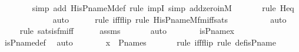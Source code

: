\begin{isabellebody}
\ \ \ \ \ \ \ \isamarkupfalse%
{\isacharparenleft}{\kern0pt}simp\ add{\isacharcolon}{\kern0pt}\ His{\isacharunderscore}{\kern0pt}P{\isacharunderscore}{\kern0pt}name{\isacharunderscore}{\kern0pt}M{\isacharunderscore}{\kern0pt}def{\isacharcomma}{\kern0pt}\ rule\ impI{\isacharcomma}{\kern0pt}\ simp\ add{\isacharcolon}{\kern0pt}zero{\isacharunderscore}{\kern0pt}in{\isacharunderscore}{\kern0pt}M{\isacharparenright}{\kern0pt}\isanewline
\ \ \ \ \ \ \isamarkupfalse%
{\isacharparenleft}{\kern0pt}rule\ Heq{\isacharparenright}{\kern0pt}\isanewline
\ \ \ \ \ \ \ \ \ \ \ \isamarkupfalse%
\ auto{\isacharbrackleft}{\kern0pt}{}{\isacharbrackright}{\kern0pt}\isanewline
\ \ \ \ \ \isamarkupfalse%
{\isacharparenleft}{\kern0pt}rule\ iff{\isacharunderscore}{\kern0pt}flip{\isacharcomma}{\kern0pt}\ rule\ His{\isacharunderscore}{\kern0pt}P{\isacharunderscore}{\kern0pt}name{\isacharunderscore}{\kern0pt}M{\isacharunderscore}{\kern0pt}fm{\isacharunderscore}{\kern0pt}iff{\isacharunderscore}{\kern0pt}sats{\isacharparenright}{\kern0pt}\isanewline
\ \ \ \ \ \ \ \ \isamarkupfalse%
\ auto{\isacharbrackleft}{\kern0pt}{}{\isacharbrackright}{\kern0pt}\isanewline
\ \ \ \ \isamarkupfalse%
{\isacharparenleft}{\kern0pt}rule\ sats{\isacharunderscore}{\kern0pt}is{\isacharunderscore}{\kern0pt}{}{\isacharunderscore}{\kern0pt}fm{\isacharunderscore}{\kern0pt}iff{\isacharparenright}{\kern0pt}\isanewline
\ \ \ \ \isamarkupfalse%
\ assms\ \isanewline
\ \ \ \ \isamarkupfalse%
\ auto\isanewline
\ \ \isamarkupfalse%
\ \isamarkupfalse%
\ {\isachardoublequoteopen}{\isachardot}{\kern0pt}{\isachardot}{\kern0pt}{\isachardot}{\kern0pt}\ {\isasymlongleftrightarrow}\ is{\isacharunderscore}{\kern0pt}P{\isacharunderscore}{\kern0pt}name{\isacharparenleft}{\kern0pt}x{\isacharparenright}{\kern0pt}\ {\isacharequal}{\kern0pt}\ {}{\isachardoublequoteclose}\ \isamarkupfalse%
\ is{\isacharunderscore}{\kern0pt}P{\isacharunderscore}{\kern0pt}name{\isacharunderscore}{\kern0pt}def\ \isamarkupfalse%
\ auto\isanewline
\ \ \isamarkupfalse%
\ \isamarkupfalse%
\ {\isachardoublequoteopen}{\isachardot}{\kern0pt}{\isachardot}{\kern0pt}{\isachardot}{\kern0pt}\ {\isasymlongleftrightarrow}\ x\ {\isasymin}\ P{\isacharunderscore}{\kern0pt}names{\isachardoublequoteclose}\ \ \isanewline
\ \ \ \ \isamarkupfalse%
{\isacharparenleft}{\kern0pt}rule\ iff{\isacharunderscore}{\kern0pt}flip{\isacharcomma}{\kern0pt}\ rule\ def{\isacharunderscore}{\kern0pt}is{\isacharunderscore}{\kern0pt}P{\isacharunderscore}{\kern0pt}name{\isacharparenright}{\kern0pt}\isanewline

\end{isabellebody}
